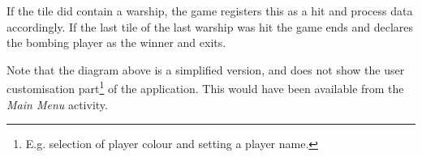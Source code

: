 If the tile did contain a warship, the game registers this as a hit and process data accordingly. If the last tile of the last warship was hit the game ends and declares the bombing player as the winner and exits.

Note that the diagram above is a simplified version, and does not show the user customisation part\footnote{E.g. selection of player colour and setting a player name.} of the application. This would have been available from the \emph{Main Menu} activity.

